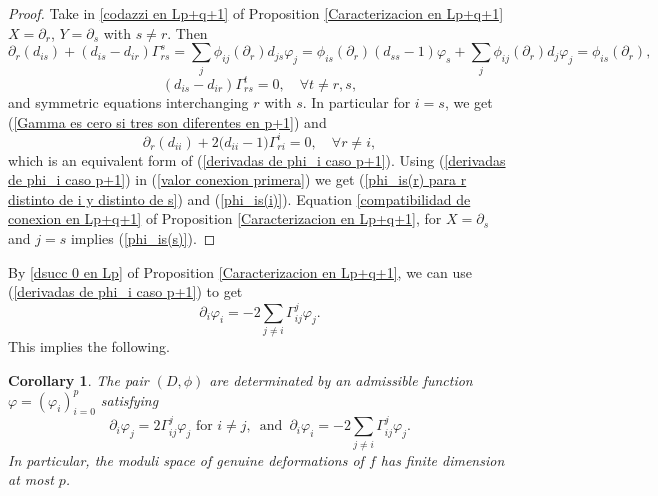 \documentclass{article}
\newtheorem{cor}[thm]{Corollary}
\theoremstyle{remark}
\begin{document}
\begin{proof}
Take in \ref{codazzi en Lp+q+1} of Proposition \ref{Caracterizacion en Lp+q+1} $X=\partial_r$, $Y=\partial_s$ with $s\neq r$. Then
    \begin{equation}\label{valor conexion primera}
        \partial_r(d_{is})+(d_{is}-d_{ir})\Gamma_{rs}^s=\sum_j\phi_{ij}(\partial_r)d_{js}\varphi_j=\phi_{is}(\partial_r)(d_{ss}-1)\varphi_s+\sum_j\phi_{ij}(\partial_r)d_j\varphi_j=\phi_{is}(\partial_r),
    \end{equation}
    $$(d_{is}-d_{ir})\Gamma_{rs}^t=0,\quad\forall t\neq r,s,$$
    and symmetric equations interchanging $r$ with $s$. In particular for $i=s$, we get (\ref{Gamma es cero si tres son diferentes en p+1}) and
    \begin{equation*}
        \partial_r(d_{ii})+2\big(d_{ii}-1\big)\Gamma_{ri}^i=0,\quad\forall r\neq i,
    \end{equation*}
    which is an equivalent form of (\ref{derivadas de phi_i caso p+1}). 
    Using (\ref{derivadas de phi_i caso p+1}) in (\ref{valor conexion primera}) we get (\ref{phi_is(r) para r distinto de i y distinto de s}) and (\ref{phi_is(i)}).
    Equation \ref{compatibilidad de conexion en Lp+q+1} of Proposition \ref{Caracterizacion en Lp+q+1}, for $X=\partial_s$ and $j=s$ implies (\ref{phi_is(s)}).
\end{proof}

By \ref{dsucc 0 en Lp} of Proposition \ref{Caracterizacion en Lp+q+1}, we can use (\ref{derivadas de phi_i caso p+1}) to get
    \begin{equation}\label{derivada_i de varphi_i}
        \partial_i\varphi_i=-2\sum_{j\neq i}\Gamma_{ij}^j\varphi_j.
    \end{equation}
This implies the following.
\begin{cor}\label{corolario f}
    The pair $(D,\phi)$ are determinated by an admissible function $\varphi=(\varphi_i)_{i=0}^p$ satisfying
    $$\partial_i\varphi_j=2\Gamma_{ij}^j\varphi_j\text{ for } i\neq j,\,\text{ and }\,\partial_i\varphi_i=-2\sum_{j\neq i}\Gamma_{ij}^j\varphi_j.$$ 
    In particular, the moduli space of genuine deformations of $f$ has finite dimension at most $p$.
\end{cor}
\end{document}
